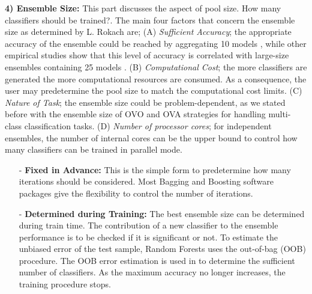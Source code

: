 \textbf{4) Ensemble Size:}
This part discusses the aspect of pool size. How many classifiers should be trained?. The main four factors that concern the ensemble size as determined by L. Rokach \cite{rokach2009} are; (A) \textit{Sufficient Accuracy}; the appropriate accuracy of the ensemble could be reached by aggregating 10 models \cite{hansen1990}, while other empirical studies show that this level of accuracy is correlated with large-size ensembles containing 25 models \cite{opitz1999}. (B) \textit{Computational Cost}; the more classifiers are generated the more computational resources are consumed. As a consequence, the user may predetermine the pool size to match the computational cost limits. (C) \textit{Nature of Task}; the ensemble size could be problem-dependent, as we stated before with the ensemble size of OVO and OVA strategies for handling multi-class classification tasks. (D) \textit{Number of processor cores}; for independent ensembles, the number of internal cores can be the upper bound to control how many classifiers can be trained in parallel mode.                      

\begin{itemize}
    \item[-]\textbf{Fixed in Advance:} This is the simple form to predetermine how many iterations should be considered. Most Bagging and Boosting software packages give the flexibility to control the number of iterations.  
    
     \item[-]\textbf{Determined during Training:} The best ensemble size can be determined during train time. The contribution of a new classifier to the ensemble performance is to be checked if it is significant or not. To estimate the unbiased error of the test sample, Random Forests uses the out-of-bag (OOB) procedure. The OOB error estimation is used in \cite{banfield2006} to determine the sufficient number of classifiers. As the maximum accuracy no longer increases, the training procedure stops.       
    
\end{itemize}



